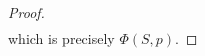 \documentclass[final,leqno]{siamltex}
\begin{document}
\begin{proof}
\begin{align*}
 \end{align*}
which is precisely $\Phi(S,p)$.
\end{proof}

\end{document}
